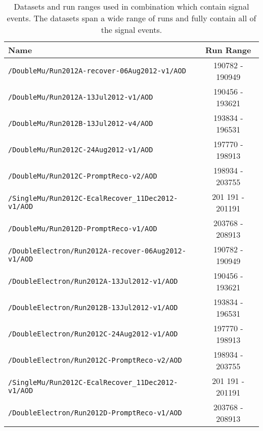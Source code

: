 \begin{table}[hbt]
\caption{\label{tab:DilDsets_run}Datasets and run ranges used in combination which contain signal events. The datasets span a wide range of runs and fully contain all of the signal events.}
\begin{center}
\begin{tabular}{lc}\hline\hline
Name		& Run Range  \\ \hline
\verb=/DoubleMu/Run2012A-recover-06Aug2012-v1/AOD=                 & 190782 - 190949 \\ 
\verb=/DoubleMu/Run2012A-13Jul2012-v1/AOD=                                  &  190456 - 193621                     \\ 
\verb=/DoubleMu/Run2012B-13Jul2012-v4/AOD=                                  &  193834 - 196531                     \\ 
\verb=/DoubleMu/Run2012C-24Aug2012-v1/AOD=                                &  197770 - 198913  \\  
\verb=/DoubleMu/Run2012C-PromptReco-v2/AOD=                               &  198934 - 203755                     \\ 
\verb=/SingleMu/Run2012C-EcalRecover_11Dec2012-v1/AOD=          & 201 191 - 201191 \\
\verb=/DoubleMu/Run2012D-PromptReco-v1/AOD=                               &  203768 - 208913   \\

\verb=/DoubleElectron/Run2012A-recover-06Aug2012-v1/AOD=         &    190782 - 190949                   \\ 
\verb=/DoubleElectron/Run2012A-13Jul2012-v1/AOD=                         & 190456 - 193621                       \\ 
\verb=/DoubleElectron/Run2012B-13Jul2012-v1/AOD=                         &  193834 - 196531  \\ 
\verb=/DoubleElectron/Run2012C-24Aug2012-v1/AOD=                       &  197770 - 198913                    \\ 
\verb=/DoubleElectron/Run2012C-PromptReco-v2/AOD=                     &   198934 - 203755                  \\ 
\verb=/SingleMu/Run2012C-EcalRecover_11Dec2012-v1/AOD=          & 201 191 - 201191 \\
\verb=/DoubleElectron/Run2012D-PromptReco-v1/AOD=                      &  203768 - 208913   \\


\end{tabular}
\end{center}
\end{table}
